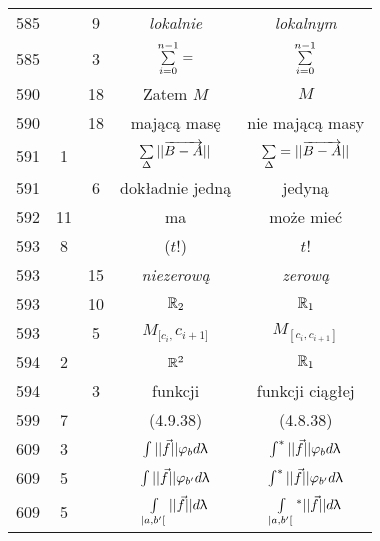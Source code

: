 \documentclass[a4paper,11pt]{article}
\begin{document}
\begin{center}
\begin{tabular}{|c|c|c|c|c|}
    585 & &  9 & \emph{lokalnie} & \emph{lokalnym} \\
    585 & &  3 & $\sum\limits_{ i = 0 }^{ n - 1 } =$
           & $\sum\limits_{ i = 0 }^{ n - 1 }$ \\
    590 & & 18 & Zatem $M$ & $M$ \\
    590 & & 18 & mającą masę & nie mającą masy \\
    591 &  1 & & $\sum\limits_{ \Delta } || \overrightarrow{ B - A } ||$
           & $\sum\limits_{ \Delta } = || \overrightarrow{ B - A } ||$ \\
    591 & &  6 & dokładnie jedną & jedyną \\
    592 & 11 & & ma & może mieć \\
    593 &  8 & & ($ t $!) & $ t $! \\
    593 & & 15 & \emph{niezerową} & \emph{zerową} \\
    593 & & 10 & $\mathbb{R}_{ 2 }$ & $\mathbb{R}_{ 1 }$ \\
    593 & &  5 & $M_{ [ c_{ i }, } c_{ i + 1 ] }$
           & $M_{ [ c_{ i }, c_{ i + 1 } ] }$ \\
    594 &  2 & & $\mathbb{R}^{ 2 }$ & $\mathbb{R}_{ 1 }$ \\
    594 & &  3 & funkcji & funkcji ciągłej \\
    599 &  7 & & (4.9.38) & (4.8.38) \\
    609 &  3 & & $\int || \vec{ f } || \varphi_{ b } d\uplambda$
           & $\int^{ * } || \vec{ f } || \varphi_{ b } d\uplambda$ \\
    609 &  5 & & $\int || \vec{ f } || \varphi_{ b' } d\uplambda$
           & $\int^{ * } || \vec{ f } || \varphi_{ b' } d\uplambda$ \\
    609 &  5 & & $\int\limits_{ | a, b' [ } || \vec{ f } || d\uplambda$
           & $\int\limits_{ | a, b' [ }{^{ * }}
             || \vec{ f } || d\uplambda$ \\ \hline
  \end{tabular}


\end{center}
\end{document}
